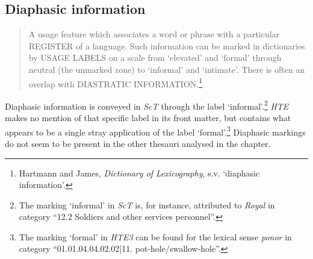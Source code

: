 \subsection*{Diaphasic information}
\begin{quotation} \noindent
A usage feature which associates a word or phrase with a particular REGISTER of a language. Such information can be marked in dictionaries by USAGE LABELS on a scale from `elevated' and `formal' through neutral (the unmarked zone) to `informal' and `intimate'. There is often an overlap with DIASTRATIC INFORMATION.\footnote{Hartmann and James, \textit{Dictionary of Lexicography}, s.v. `diaphasic information'.}
\end{quotation}
Diaphasic information is conveyed in \textit{ScT} through the label `informal'.\footnote{The marking `informal' in \textit{ScT} is, for instance, attributed to \textit{Royal} in category ``12.2 Soldiers and other services personnel''.} \textit{HTE} makes no mention of that specific label in its front matter, but contains what appears to be a single stray application of the label `formal'.\footnote{The marking `formal' in \textit{HTE3} can be found for the lexical sense \textit{ponor} in category ``01.01.04.04.02.02|11. pot-hole/swallow-hole''.} Diaphasic markings do not seem to be present in the other thesauri analysed in the chapter.

